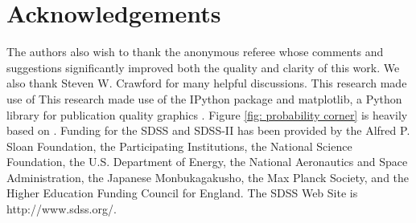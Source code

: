 \documentclass[fleqn,usenatbib]{mnras}
\begin{document}
\section*{Acknowledgements}
The authors also wish to thank the anonymous referee whose comments and suggestions significantly improved both the quality and clarity of this work. We also thank Steven W. Crawford for many helpful discussions. This research made use of This research made use of the {\sc IPython} package \citep{Perez2007} and {\sc matplotlib}, a Python library for publication quality graphics \citep{Hunter2007}. Figure \ref{fig: probability corner} is heavily based on \cite{Foreman-Mackey2016}. Funding for the SDSS and SDSS-II has been provided by the Alfred P. Sloan Foundation, the Participating Institutions, the National Science Foundation, the U.S. Department of Energy, the National Aeronautics and Space Administration, the Japanese Monbukagakusho, the Max Planck Society, and the Higher Education Funding Council for England. The SDSS Web Site is http://www.sdss.org/.



%
%

\bsp	%
\label{lastpage}
\end{document}
